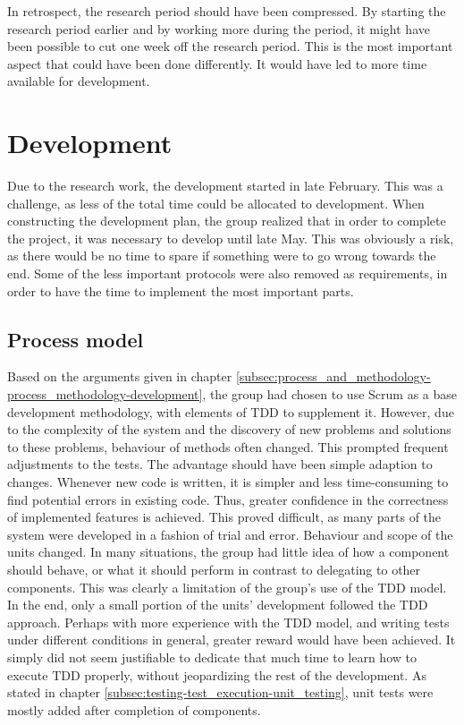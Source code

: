 In retrospect, the research period should have been compressed. By starting the research period earlier and by working more during the period, it might have been possible to cut one week off the research period. This is the most important aspect that could have been done differently. It would have led to more time available for development.

\section{Development}
\label{sec:project_evaluation-development}

Due to the research work, the development started in late February. This was a challenge, as less of the total time could be allocated to development. When constructing the development plan, the group realized that in order to complete the project, it was necessary to develop until late May. This was obviously a risk, as there would be no time to spare if something were to go wrong towards the end. Some of the less important protocols were also removed as requirements, in order to have the time to implement the most important parts.

\subsection{Process model}
\label{subsec:project_evaluation-development-process_model}

Based on the arguments given in chapter \ref{subsec:process_and_methodology-process_methodology-development}, the group had chosen to use Scrum as a base development methodology, with elements of TDD to supplement it. However, due to the complexity of the system and the discovery of new problems and solutions to these problems, behaviour of methods often changed. This prompted frequent adjustments to the tests. The advantage should have been simple adaption to changes. Whenever new code is written, it is simpler and less time-consuming to find potential errors in existing code. Thus, greater confidence in the correctness of implemented features is achieved. This proved difficult, as many parts of the system were developed in a fashion of trial and error. Behaviour and scope of the units changed. In many situations, the group had little idea of how a component should behave, or what it should perform in contrast to delegating to other components. This was clearly a limitation of the group's use of the TDD model. In the end, only a small portion of the units' development followed the TDD approach. Perhaps with more experience with the TDD model, and writing tests under different conditions in general, greater reward would have been achieved. It simply did not seem justifiable to dedicate that much time to learn how to execute TDD properly, without jeopardizing the rest of the development. As stated in chapter \ref{subsec:testing-test_execution-unit_testing}, unit tests were mostly added after completion of components.

